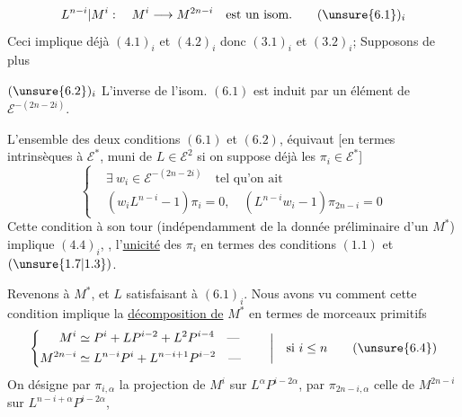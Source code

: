 \[
L^{n-i}|M^i:\quad M^i\longrightarrow M^{2n-i}\quad\text{est un isom.}
\tag*{$(\unsure{6.1})_i$}
\]
Ceci implique déjà $(4.1)_i$ et $(4.2)_i$ donc $(3.1)_i$ et $(3.2)_i$;  Supposons de plus

$(\unsure{6.2})_i$ L'inverse de l'isom. $(6.1)$ est  induit par un élément de $\mathcal E^{-(2n-2i)}$.

 L'ensemble des deux conditions $(6.1)$ et $(6.2)$, équivaut [en termes intrinsèques à $\mathcal E^*$, muni de $L\in\mathcal E^2$ si on suppose déjà les $\pi_i\in\mathcal E^*$]
\[
\left\{\begin{aligned}
&\exists\ w_i\in\mathcal E^{-(2n-2i)}\quad\text{tel qu'on ait}\\
&(w_iL^{n-i}-1)\pi_i=0,\quad(L^{n-i}w_i-1)\pi_{2n-i}=0
\end{aligned}\right.
\tag*{$(6.3.)_i$}
\]
Cette condition à son tour (indépendamment de la donnée préliminaire d'un $M^*$) implique $(4.4)_i$, ,  l'\uline{unicité} des $\pi_i$ en termes des conditions $(1.1)$ et $(\unsure{1.7|1.3})$.

Revenons à $M^*$, et $L$ satisfaisant à $(6.1)_i$. Nous avons vu comment  cette condition implique la \uline{décomposition de} $M^*$ en termes  de morceaux primitifs
\[
\left\{\begin{aligned}
M^i&\simeq P^i+LP^{i-2}+L^2P^{i-4}\quad\text{---}\\
M^{2n-i}&\simeq L^{n-i}P^i+L^{n-i+1}P^{i-2}\quad\text{---}
\end{aligned}\right.\qquad\bigg|\quad\text{si }i\leq n
\tag{\unsure{6.4}}
\]
On désigne par $\pi_{i,\alpha}$ la projection de $M^i$ sur $L^\alpha P^{i-2\alpha}$, par $\pi_{2n-i,\alpha}$ celle de $M^{2n-i}$ sur $L^{n-i+\alpha}P^{i-2\alpha}$,
